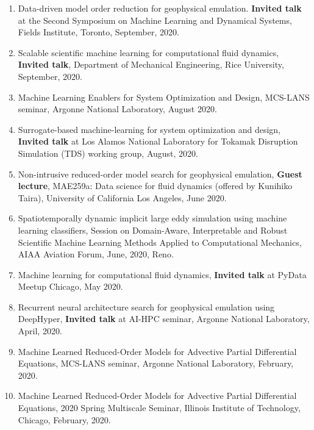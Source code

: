 \documentclass[letterpaper]{article}
\begin{document}
\begin{enumerate}
\item Data-driven model order reduction for geophysical emulation. \textbf{Invited talk} at the Second Symposium on Machine Learning and Dynamical Systems, Fields Institute, Toronto, September, 2020.

\item Scalable scientific machine learning for computational fluid dynamics, \textbf{Invited talk}, Department of Mechanical Engineering, Rice University, September, 2020.

\item Machine Learning Enablers for System Optimization and Design, MCS-LANS seminar, Argonne National Laboratory, August 2020.

\item Surrogate-based machine-learning for system optimization and design, \textbf{Invited talk} at Los Alamos National Laboratory for Tokamak Disruption Simulation (TDS) working group, August, 2020.

\item Non-intrusive reduced-order model search for geophysical emulation, \textbf{Guest lecture}, MAE259a: Data science for fluid dynamics (offered by Kunihiko Taira), University of California Los Angeles, June 2020.

\item Spatiotemporally dynamic implicit large eddy simulation using machine learning classifiers, Session on Domain-Aware, Interpretable and Robust Scientific Machine Learning Methods Applied to Computational Mechanics, AIAA Aviation Forum, June, 2020, Reno. 

\item Machine learning for computational fluid dynamics, \textbf{Invited talk} at PyData Meetup Chicago, May 2020.

\item Recurrent neural architecture search for geophysical emulation using DeepHyper, \textbf{Invited talk} at AI-HPC seminar, Argonne National Laboratory, April, 2020.

\item Machine Learned Reduced-Order Models for Advective Partial Differential Equations, MCS-LANS seminar, Argonne National Laboratory, February, 2020.

\item Machine Learned Reduced-Order Models for Advective Partial Differential Equations, 2020 Spring Multiscale Seminar, Illinois Institute of Technology, Chicago, February, 2020.


\end{enumerate}
\end{document}
